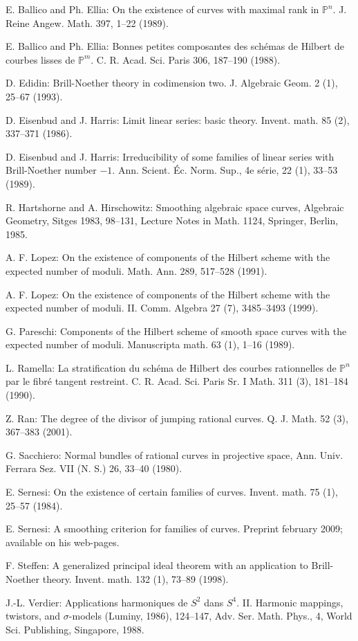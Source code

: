 \documentclass{amsart}
\theoremstyle{plain}
\theoremstyle{definition}
\begin{document}
\begin{thebibliography}{99}

 E. Ballico and Ph. Ellia: On the existence of curves with maximal rank in $\mathbb {P}^n$. J. Reine Angew. Math.
397, 1--22 (1989).


 E. Ballico and Ph. Ellia: Bonnes petites composantes des sch\'{e}mas de Hilbert de courbes lisses de $\mathbb {P}^m$. C. R. Acad.
Sci. Paris 306, 187--190 (1988).

 D. Edidin: Brill-Noether theory in codimension two. J. Algebraic Geom. 2 (1), 25--67 (1993).

 D. Eisenbud and J. Harris: Limit linear series: basic theory. Invent. math. 85 (2), 337--371 (1986).

 D. Eisenbud and J. Harris: Irreducibility of some families of linear series with Brill-Noether number $-1$. Ann. Scient. \'{E}c. Norm.
Sup., 4e s\'{e}rie, 22 (1), 33--53 (1989).

 R. Hartshorne and A. Hirschowitz: Smoothing algebraic space curves, Algebraic Geometry, Sitges 1983, 98--131, Lecture Notes in Math.
1124, Springer, Berlin, 1985.


 A. F. Lopez: On the existence of components of the Hilbert scheme with the expected number of moduli. Math. Ann.
289, 517--528 (1991).

 A. F. Lopez: On the existence of components of the Hilbert scheme with the expected number of moduli. II. Comm. Algebra
27 (7), 3485--3493 (1999).

 G. Pareschi: Components of the Hilbert scheme of smooth space curves with the expected number of moduli.
Manuscripta math. 63 (1), 1--16 (1989).

 L. Ramella: La stratification du sch\'{e}ma de Hilbert des courbes rationnelles de $\mathbb {P}^n$ par le fibr\'{e} tangent restreint. C. R. Acad. Sci. Paris Sr. I Math. 311 (3), 181--184 (1990).

 Z. Ran: The degree of the divisor of jumping rational curves. Q. J. Math. 52 (3), 367--383 (2001).



 G. Sacchiero: Normal bundles of rational curves in projective space, Ann. Univ. Ferrara Sez. VII
(N. S.) 26, 33--40 (1980).

 E. Sernesi: On the existence of certain families of curves. Invent. math. 75 (1), 25--57 (1984).

 E. Sernesi: A smoothing criterion for families of curves. Preprint february 2009; available on his web-pages.


 F. Steffen:  A generalized principal ideal theorem with an application to Brill-Noether theory.
Invent. math. 132 (1), 73--89 (1998).

 J.-L. Verdier: Applications harmoniques de $S^2$ dans $S^4$. II. Harmonic mappings, twistors, and $\sigma$-models (Luminy, 1986), 124--147,
Adv. Ser. Math. Phys., 4, World Sci. Publishing, Singapore, 1988.

\end{thebibliography}
\end{document}
